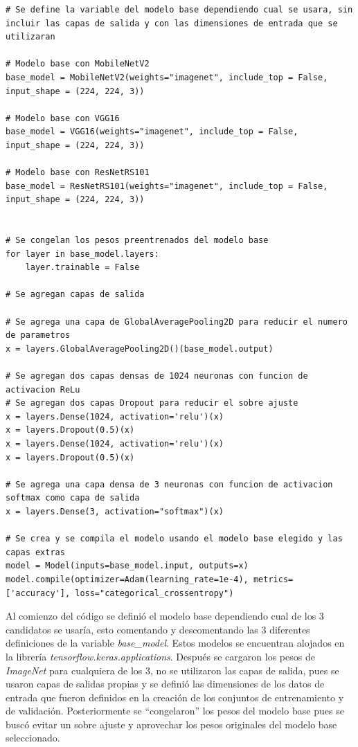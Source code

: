 \begin{lstlisting}[caption={Código creación CNN con \textit{Transfer Learning} con diferentes modelos base}]
# Se define la variable del modelo base dependiendo cual se usara, sin incluir las capas de salida y con las dimensiones de entrada que se utilizaran

# Modelo base con MobileNetV2
base_model = MobileNetV2(weights="imagenet", include_top = False, input_shape = (224, 224, 3))

# Modelo base con VGG16
base_model = VGG16(weights="imagenet", include_top = False, input_shape = (224, 224, 3))

# Modelo base con ResNetRS101
base_model = ResNetRS101(weights="imagenet", include_top = False, input_shape = (224, 224, 3))


# Se congelan los pesos preentrenados del modelo base
for layer in base_model.layers:
    layer.trainable = False

# Se agregan capas de salida 

# Se agrega una capa de GlobalAveragePooling2D para reducir el numero de parametros
x = layers.GlobalAveragePooling2D()(base_model.output)

# Se agregan dos capas densas de 1024 neuronas con funcion de activacion ReLu
# Se agregan dos capas Dropout para reducir el sobre ajuste
x = layers.Dense(1024, activation='relu')(x)
x = layers.Dropout(0.5)(x)
x = layers.Dense(1024, activation='relu')(x)
x = layers.Dropout(0.5)(x)

# Se agrega una capa densa de 3 neuronas con funcion de activacion softmax como capa de salida
x = layers.Dense(3, activation="softmax")(x)

# Se crea y se compila el modelo usando el modelo base elegido y las capas extras
model = Model(inputs=base_model.input, outputs=x)
model.compile(optimizer=Adam(learning_rate=1e-4), metrics=['accuracy'], loss="categorical_crossentropy")
\end{lstlisting}

Al comienzo del código se definió el modelo base dependiendo cual de los 3 candidatos se usaría, esto comentando y descomentando las 3 diferentes definiciones de la variable \textit{base\_model}. Estos modelos se encuentran alojados en la librería \textit{tensorflow.keras.applications}. Después se cargaron los pesos de \textit{ImageNet} para cualquiera de los 3, no se utilizaron las capas de salida, pues se usaron capas de salidas propias y se definió las dimensiones de los datos de entrada que fueron definidos en la creación de los conjuntos de entrenamiento y de validación. Posteriormente se ``congelaron'' los pesos del modelo base pues se buscó evitar un sobre ajuste y aprovechar los pesos originales del modelo base seleccionado.

